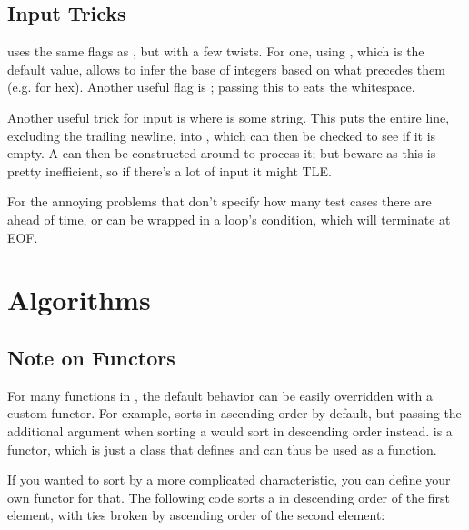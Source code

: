 \documentclass[../main]{subfiles}
\begin{document}
\subsection{Input Tricks}

\par
{} uses the same  flags as , but with a few twists. For one, using , which is the default value, allows  to infer the base of integers based on what precedes them (e.g.  for hex). Another useful flag is ; passing this to  eats the whitespace.

\par
Another useful trick for input is  where  is some string. This puts the entire line, excluding the trailing newline, into , which can then be checked to see if it is empty. A  can then be constructed around  to process it; but beware as this is pretty inefficient, so if there's a lot of input it might TLE. 

\par
For the annoying problems that don't specify how many test cases there are ahead of time,  or  can be wrapped in a  loop's condition, which will terminate at EOF.

\section{Algorithms}

\subsection{Note on Functors}

\par
For many functions in , the default behavior can be easily overridden with a custom functor. For example,  sorts in ascending order by default, but passing the additional argument  when sorting a  would sort in descending order instead.  is a functor, which is just a class that defines  and can thus be used as a function.

\par
If you wanted to sort by a more complicated characteristic, you can define your own functor for that. The following code sorts a  in descending order of the first element, with ties broken by ascending order of the second element:
\end{document}
